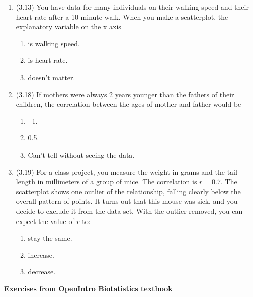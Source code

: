 \documentclass[
  letterpaper,
  DIV=11,
  numbers=noendperiod]{scrreprt}
\providecommand{\tightlist}{%
  \setlength{\itemsep}{0pt}\setlength{\parskip}{0pt}}\usepackage{longtable,booktabs,array}
\begin{document}
\begin{enumerate}
\def\labelenumi{\arabic{enumi}.}
\setcounter{enumi}{3}
\tightlist
\item
  (3.13) You have data for many individuals on their walking speed and
  their heart rate after a 10-minute walk. When you make a scatterplot,
  the explanatory variable on the x axis

  \begin{enumerate}
  \def\labelenumii{\alph{enumii}.}
  \tightlist
  \item
    is walking speed.
  \item
    is heart rate.
  \item
    doesn't matter.
  \end{enumerate}
\item
  (3.18) If mothers were always 2 years younger than the fathers of
  their children, the correlation between the ages of mother and father
  would be

  \begin{enumerate}
  \def\labelenumii{\alph{enumii}.}
  \item
    \begin{enumerate}
    \def\labelenumiii{\arabic{enumiii}.}
    \tightlist
    \item
    \end{enumerate}
  \item
    0.5.
  \item
    Can't tell without seeing the data.
  \end{enumerate}
\item
  (3.19) For a class project, you measure the weight in grams and the
  tail length in millimeters of a group of mice. The correlation is
  \(r = 0.7\). The scatterplot shows one outlier of the relationship,
  falling clearly below the overall pattern of points. It turns out that
  this mouse was sick, and you decide to exclude it from the data set.
  With the outlier removed, you can expect the value of \(r\) to:

  \begin{enumerate}
  \def\labelenumii{\alph{enumii}.}
  \tightlist
  \item
    stay the same.
  \item
    increase.
  \item
    decrease.
  \end{enumerate}
\end{enumerate}

\textbf{Exercises from OpenIntro Biotatistics textbook}
\end{document}
